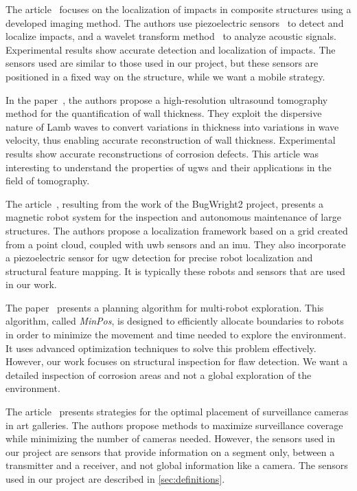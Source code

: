 The article~\cite{inventions3030059} focuses on the localization of impacts in composite structures using a developed imaging method.
The authors use piezoelectric sensors~\cite{enwiki:1154129092} to detect and localize impacts, and a wavelet transform method~\cite{enwiki:1147185762} to analyze acoustic signals.
Experimental results show accurate detection and localization of impacts.
The sensors used are similar to those used in our project, but these sensors are positioned in a fixed way on the structure, while we want a mobile strategy.

In the paper~\cite{HUTHWAITE2013979}, the authors propose a high-resolution ultrasound tomography method for the quantification of wall thickness.
They exploit the dispersive nature of Lamb waves to convert variations in thickness into variations in wave velocity, thus enabling accurate reconstruction of wall thickness.
Experimental results show accurate reconstructions of corrosion defects.
This article was interesting to understand the properties of \gls{ugw}s and their applications in the field of tomography.

The article~\cite{s22093235}, resulting from the work of the BugWright2 project, presents a magnetic robot system for the inspection and autonomous maintenance of large structures.
The authors propose a localization framework based on a grid created from a point cloud, coupled with \gls{uwb} sensors and an \gls{imu}.
They also incorporate a piezoelectric sensor for \gls{ugw} detection for precise robot localization and structural feature mapping.
It is typically these robots and sensors that are used in our work.

The paper~\cite{bautin:hal-00757960} presents a planning algorithm for multi-robot exploration.
This algorithm, called \textit{MinPos}, is designed to efficiently allocate boundaries to robots in order to minimize the movement and time needed to explore the environment. It uses advanced optimization techniques to solve this problem effectively.
However, our work focuses on structural inspection for flaw detection.
We want a detailed inspection of corrosion areas and not a global exploration of the environment.

The article~\cite{article455556} presents strategies for the optimal placement of surveillance cameras in art galleries.
The authors propose methods to maximize surveillance coverage while minimizing the number of cameras needed.
However, the sensors used in our project are sensors that provide information on a segment only, between a transmitter and a receiver, and not global information like a camera.
The sensors used in our project are described in \ref{sec:definitions}.

